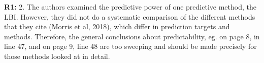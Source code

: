 \documentclass[aps,rmp,onecolumn]{revtex4-1}
\newcommand{\refa}[1]{\textbf{R1:} #1\vskip 5mm}
\begin{document}

\refa{2. The authors examined the predictive power of one predictive
method, the LBI. However, they did not do a systematic comparison of
the different methods that they cite (Morris et al, 2018), which differ in prediction
targets and methods. Therefore, the general conclusions about
predictability, eg. on page 8, in line 47, and on page 9, line 48 are
too sweeping and should be made precisely for those methods looked at
in detail.}
\end{document}
